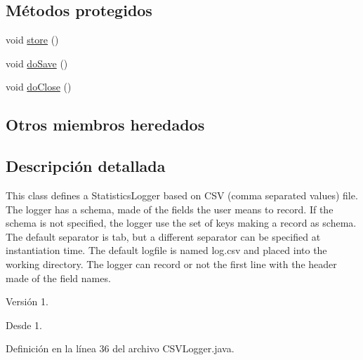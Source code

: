 \subsection*{Métodos protegidos}
\begin{DoxyCompactItemize}
\item 
void \hyperlink{classjenes_1_1utils_1_1_c_s_v_logger_a863bcfda3e93b023949a81e7f6d149e7}{store} ()
\item 
void \hyperlink{classjenes_1_1utils_1_1_c_s_v_logger_a09a4f4fc362db6d4090d75642521ee65}{do\-Save} ()
\item 
void \hyperlink{classjenes_1_1utils_1_1_c_s_v_logger_ac89f6fe5bd609fcc02ca7adf1407f279}{do\-Close} ()
\end{DoxyCompactItemize}
\subsection*{Otros miembros heredados}


\subsection{Descripción detallada}
This class defines a Statistics\-Logger based on C\-S\-V (comma separated values) file. The logger has a schema, made of the fields the user means to record. If the schema is not specified, the logger use the set of keys making a record as schema. The default separator is tab, but a different separator can be specified at instantiation time. The default logfile is named log.\-csv and placed into the working directory. The logger can record or not the first line with the header made of the field names.

\begin{DoxyVersion}{Versión}
1. 
\end{DoxyVersion}
\begin{DoxySince}{Desde}
1. 
\end{DoxySince}


Definición en la línea 36 del archivo C\-S\-V\-Logger.\-java.



